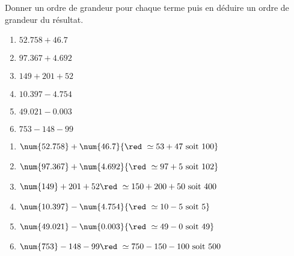 \begin{exercice}
    Donner un ordre de grandeur pour chaque terme puis en déduire un ordre de grandeur du résultat.
    \begin{multicols}{2}
        \begin{spacing}{1.5}
            \begin{enumerate}
                \item $\num{52.758}   + \num{46.7}$
                \item $\num{97.367}   + \num{4.692}$
                \item $\num{149   }   + 201 + 52$
                \item $\num{10.397}   - \num{4.754}$
                \item $\num{49.021}   - \num{0.003}$
                \item $\num{753   }   - 148 - 99$
            \end{enumerate}
        \end{spacing}
    \end{multicols}
 \end{exercice}
 \begin{corrige}
    \begin{enumerate}
        \item $\num{52.758}   + \num{46.7}  {\red ~\simeq 53 + 47        \text{ soit 100}}$
        \item $\num{97.367}   + \num{4.692} {\red ~\simeq 97 + 5         \text{ soit 102}}$
        \item $\num{149   }   + 201 + 52    {\red ~\simeq 150 + 200 + 50 \text{ soit 400}}$
        \item $\num{10.397}   - \num{4.754} {\red ~\simeq 10 - 5         \text{ soit 5}}$
        \item $\num{49.021}   - \num{0.003} {\red ~\simeq 49 - 0         \text{ soit 49}}$
        \item $\num{753   }   - 148 - 99    {\red ~\simeq 750 - 150 -100 \text{ soit 500}}$
    \end{enumerate}
 \end{corrige}